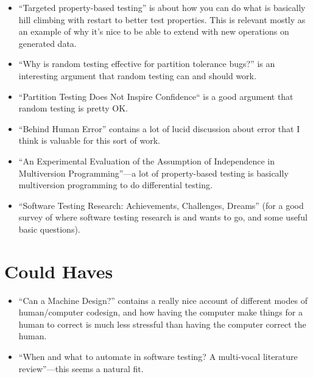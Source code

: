 \begin{itemize}
\item ``Targeted property-based testing''\cite{DBLP:conf/issta/LoscherS17} is about how you can do what is basically hill climbing with restart to better test properties.
This is relevant mostly as an example of why it's nice to be able to extend with new operations on generated data.
\item ``Why is random testing effective for partition tolerance bugs?''\cite{DBLP:journals/pacmpl/MajumdarN18} is an interesting argument that random testing can and should work.
\item ``Partition Testing Does Not Inspire Confidence``\cite{DBLP:journals/tse/HamletT90} is a good argument that random testing is pretty OK.
\item ``Behind Human Error''\cite{BehindHumanError} contains a lot of lucid discussion about error that I think is valuable for this sort of work.
\item ``An Experimental Evaluation of the Assumption of Independence in Multiversion Programming''\cite{DBLP:journals/tse/KnightL86}---a
lot of property-based testing is basically multiversion programming to do differential testing.
\item ``Software Testing Research: Achievements, Challenges, Dreams''\cite{DBLP:conf/icse/Bertolino07} (for a good survey of where software testing research is and wants to go, and some useful basic questions).
\end{itemize}

\section{Could Haves}

\begin{itemize}
\item ``Can a Machine Design?''\cite{doi:10.1162/07479360152681083} contains a really nice account of different modes of human/computer codesign,
and how having the computer make things for a human to correct is much less stressful than having the computer correct the human.
\item ``When and what to automate in software testing? {A} multi-vocal literature review''\cite{DBLP:journals/infsof/GarousiM16}---this
seems a natural fit.
\end{itemize}





